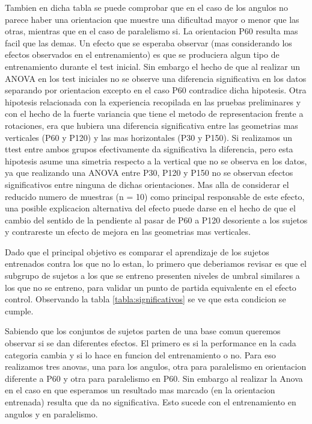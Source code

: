\documentclass{article}
\begin{document}
Tambien en dicha tabla se puede comprobar que en el caso de los angulos no parece haber una orientacion que muestre una dificultad mayor o menor que las otras, mientras que en el caso de paralelismo si. La orientacion P60 resulta mas facil que las demas. Un efecto que se esperaba observar (mas considerando los efectos observados en el entrenamiento) es que se produciera algun tipo de entrenamiento durante el test inicial. Sin embargo el hecho de que al realizar un ANOVA en los test iniciales no se observe una diferencia significativa en los datos separando por orientacion excepto en el caso P60 contradice dicha hipotesis. Otra hipotesis relacionada con la experiencia recopilada en las pruebas preliminares y con el hecho de la fuerte variancia que tiene el metodo de representacion frente a rotaciones, era que hubiera una diferencia significativa entre las geometrias mas verticales (P60 y P120) y las mas horizontales (P30 y P150). Si realizamos un ttest entre ambos grupos efectivamente da significativa la diferencia, pero esta hipotesis asume una simetria respecto a la vertical que no se observa en los datos, ya que realizando una ANOVA entre P30, P120 y P150 no se observan efectos significativos entre ninguna de dichas orientaciones. Mas alla de considerar el reducido numero de muestras (n = 10) como principal responsable de este efecto, una posible explicacion alternativa del efecto puede darse en el hecho de que el cambio del sentido de la pendiente al pasar de P60 a P120 desoriente a los sujetos y contrareste un efecto de mejora en las geometrias mas verticales. 

Dado que el principal objetivo es comparar el aprendizaje de los sujetos entrenados contra los que no lo estan, lo primero que deberiamos revisar es que el subgrupo de sujetos a los que se entreno presenten niveles de umbral similares a los que no se entreno, para validar un punto de partida equivalente en el efecto control. Observando la tabla \ref{tabla:significativos} se ve que esta condicion se cumple. 

Sabiendo que los conjuntos de sujetos parten de una base comun queremos observar si se dan diferentes efectos. El primero es si la performance en la cada categoria cambia y si lo hace en funcion del entrenamiento o no. Para eso realizamos tres anovas, una para los angulos, otra para paralelismo en orientacion diferente a P60 y otra para paralelismo en P60. Sin embargo al realizar la Anova en el caso en que esperamos un resultado mas marcado (en la orientacion entrenada) resulta que da no significativa. Esto sucede con el entrenamiento en angulos y en paralelismo.
\end{document}
